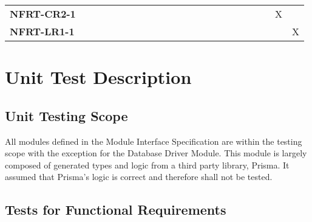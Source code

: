 \documentclass[12pt, titlepage]{article}
\begin{document}
\begin{landscape}
\begin{longtable}{|l|ccccccccccccccc|}
		\textbf{NFRT-CR2-1} & ~                                                         & ~            & ~            & ~            & ~            & ~            & ~            & ~            & ~            & ~            & ~            & ~            & ~            & X            & ~            \\
		\textbf{NFRT-LR1-1} & ~                                                         & ~            & ~            & ~            & ~            & ~            & ~            & ~            & ~            & ~            & ~            & ~            & ~            & ~            & X            \\
		\hline
	\end{longtable}
\end{landscape}

\section{Unit Test Description} \label{Unit Test Description}

\subsection{Unit Testing Scope}


All modules defined in the Module Interface Specification are within the testing scope with the
exception for the Database Driver Module. This module is largely composed of generated types and
logic from a third party library, Prisma. It assumed that Prisma's logic is correct and therefore
shall not be tested.

\subsection{Tests for Functional Requirements}

\end{document}
